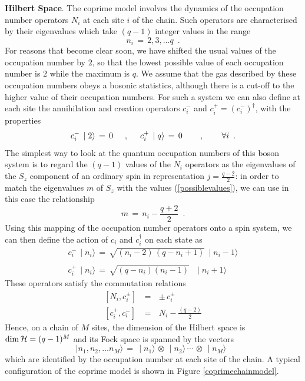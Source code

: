 \documentclass[aps,pra,superscriptaddress]{revtex4}
\newcommand\be            {\begin{equation}}
\newcommand\ee            {\end{equation}}
\renewcommand{\(}{\left(}
\renewcommand{\)}{\right)}
\renewcommand{\[}{\left[}
\renewcommand{\]}{\right]}
\begin{document}
\vspace{3mm}
\noindent
{\bf Hilbert Space}. The coprime model involves the dynamics of the occupation number operators $N_i$ at each site $i$ of the chain. Such operators 
are characterised by their eigenvalues which take $(q-1)$ integer values in the range  
\be
n_i \,=\,2,3,\ldots q \,\,\,.
\label{possiblevalues}
\ee 
For reasons that become clear soon, we have shifted the usual values of the occupation number by $2$, so that the lowest possible value of each occupation number is $2$ while the maximum is $q$. We assume that the gas described by these occupation numbers obeys a bosonic statistics, although 
there is a cut-off to the higher value of their occupation numbers. For such a system we can also define at each site the annihilation and creation operators $c_i^-$ and $c_i^+ = (c_i^-)^\dagger$, with the properties  
\be 
c_i^-\,\mid 2 \rangle \,=\, 0 
\hspace{5mm}
,
\hspace{5mm}
c_i^+ \, \mid q \rangle \,=\, 0 
\,\,\,\,\,\,\,\,\,\,\,\,\,
,
\,\,\,\,\,\,\,\,\,\,\,\,\,
\forall i \,\,\,.
\ee
The simplest way to look at the quantum occupation numbers of this boson system is to regard the $(q-1)$ values of the $N_i$ operators 
as the eigenvalues of the $S_z$ component of an ordinary spin in representation $j = \frac{q-2}{2}$: in order to match the eigenvalues 
$m$ of $S_z$ with the values (\ref{possiblevalues}), we can use in this case the relationship
\be 
m \,=\, n_i -\frac{q+2}{2} \,\,\,. 
\ee
Using this mapping of the occupation number operators onto a spin system, we can then define the action of $c_i$ and $c_i^\dagger$ 
on each state as  
\be 
\begin{array}{l}
c_i^- \,\mid n_i \rangle \,=\,\sqrt{(n_i -2) \,(q - n_i +1)} \,\mid n_i -1\rangle \\
\\
c_i^+ \,\mid n_i \rangle \,=\, \sqrt{(q - n_i) (n_i -1)} \,\,\,\,\mid n_i +1 \rangle 
\end{array}
\ee
These operators satisfy the commutation relations 
\begin{eqnarray}
\left[N_i , c_i^\pm \right] &\,=\,&  \pm \, c_i^\pm  \label{commutationrelation}\\
\left[c_i^+ , c_i^-\right] & \,=\, & N_i - \frac{(q-2)}{2}   
\end{eqnarray}
Hence, on a chain of $M$ sites, the dimension of the Hilbert space is ${\rm dim}\, {\cal H} = (q-1)^M$ and its Fock space is spanned by the 
vectors 
\be 
\mid n_1, n_2, \ldots n_M \rangle \,=\, \mid n_1 \rangle \, \otimes \,\mid n_2 \rangle \, \cdots \,\otimes \, \mid n_M \rangle \,\,\,
\ee
which are identified by the occupation number at each site of the chain. A typical configuration of the coprime model is shown in Figure \ref{coprimechainmodel}. 
\end{document}
